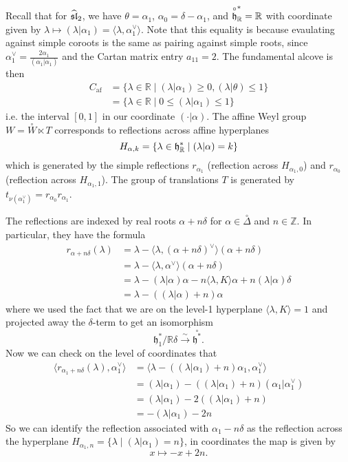 \documentclass[12pt]{article}
\begin{document}
\begin{example}
    [Affine $\sl_2$] Recall that for $\widehat{\sl}_2$, we have $\theta = \alpha_1$, $\alpha_0 = \delta - \alpha_1$, and $\overset{\circ}{\mf h}^*_\mathbb{R} = \mathbb{R}$ with coordinate given by $\lambda \mapsto (\lambda|\alpha_1) = \langle \lambda, \alpha_1^\vee \rangle$. Note that this equality is because evaulating against simple coroots is the same as pairing against simple roots, since $\alpha_1^\vee = \frac{2\alpha_1}{(\alpha_1|\alpha_1)}$ and the Cartan matrix entry $a_{11} = 2$. The fundamental alcove is then \begin{align*}
    C_{\mathrm{af}} &= \{\lambda \in \mathbb{R} \mid (\lambda|\alpha_1) \geq 0, (\lambda|\theta) \leq 1\} \\
    &= \{\lambda \in \mathbb{R} \mid 0 \leq (\lambda|\alpha_1) \leq 1\}
    \end{align*} i.e. the interval $[0,1]$ in our coordinate $(\cdot | \alpha)$. The affine Weyl group $W = \overset{\circ}{W} \ltimes T$ corresponds to reflections across affine hyperplanes \[H_{\alpha,k} = \{\lambda \in \mf h^*_\mathbb{R} \mid (\lambda|\alpha) = k\}\] which is generated by the simple reflections $r_{\alpha_1}$ (reflection across $H_{\alpha_1,0}$) and $r_{\alpha_0}$ (reflection across $H_{\alpha_1,1}$). The group of translations $T$ is generated by $t_{\nu(\alpha_1^\vee)} = r_{\alpha_0} r_{\alpha_1}$.

The reflections are indexed by real roots $\alpha + n\delta$ for $\alpha \in \overset{\circ}{\Delta}$ and $n \in \mathbb{Z}$. In particular, they have the formula \begin{align*}
    r_{\alpha + n\delta}(\lambda) &= \lambda - \langle \lambda, (\alpha + n\delta)^\vee \rangle (\alpha + n\delta) \\
    &= \lambda - \langle \lambda, \alpha^\vee \rangle (\alpha + n\delta) \\
    &= \lambda - (\lambda|\alpha)\alpha - n\langle \lambda, K\rangle \alpha + n(\lambda|\alpha)\delta \\
    &= \lambda - ((\lambda|\alpha) + n)\alpha
\end{align*} where we used the fact that we are on the level-1 hyperplane $\langle \lambda, K \rangle = 1$ and projected away the $\delta$-term to get an isomorphism \[\mathfrak{h}^*_1/\mathbb{R}\delta \xrightarrow{\sim} \overset{\circ}{\mathfrak{h}^*}.\] Now we can check on the level of coordinates that \begin{align*}
    \langle r_{\alpha_1 + n\delta}(\lambda), \alpha_1^\vee \rangle &= \langle \lambda - ((\lambda|\alpha_1) + n)\alpha_1, \alpha_1^\vee \rangle \\
    &= (\lambda|\alpha_1) - ((\lambda|\alpha_1) + n)(\alpha_1|\alpha_1^\vee) \\
    &= (\lambda|\alpha_1) - 2((\lambda|\alpha_1) + n) \\
    &= -(\lambda|\alpha_1) - 2n
\end{align*}
So we can identify the reflection associated with $\alpha_1 - n\delta$ as the reflection across the hyperplane $H_{\alpha_1,n} = \{\lambda \mid (\lambda|\alpha_1) = n\}$, in coordinates the map is given by \[x \mapsto -x + 2n.\] 


\end{example}
\end{document}
